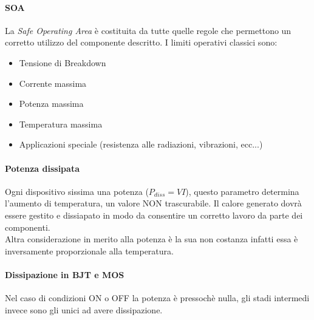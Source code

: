 \documentclass[12pt]{article}
\begin{document}
\paragraph{SOA} La \textit{Safe Operating Area} è costituita da tutte quelle regole che permettono un corretto utilizzo del componente descritto. I limiti operativi classici sono:
\begin{itemize}
  \item Tensione di Breakdown
  \item Corrente massima
  \item Potenza massima
  \item Temperatura massima
  \item Applicazioni speciale (resistenza alle radiazioni, vibrazioni, ecc...)
\end{itemize}

\paragraph{Potenza dissipata} Ogni dispositivo sissima una potenza ($P_{diss} = V I$), questo parametro determina l'aumento di temperatura, un valore NON trascurabile. Il calore generato dovrà essere gestito e dissiapato in modo da consentire un corretto lavoro da parte dei componenti.\\
Altra considerazione in merito alla potenza è la sua non costanza infatti essa è inversamente proporzionale alla temperatura.

\paragraph{Dissipazione in BJT e MOS} Nel caso di condizioni ON o OFF la potenza è pressochè nulla, gli stadi intermedi invece sono gli unici ad avere dissipazione.

\end{document}
